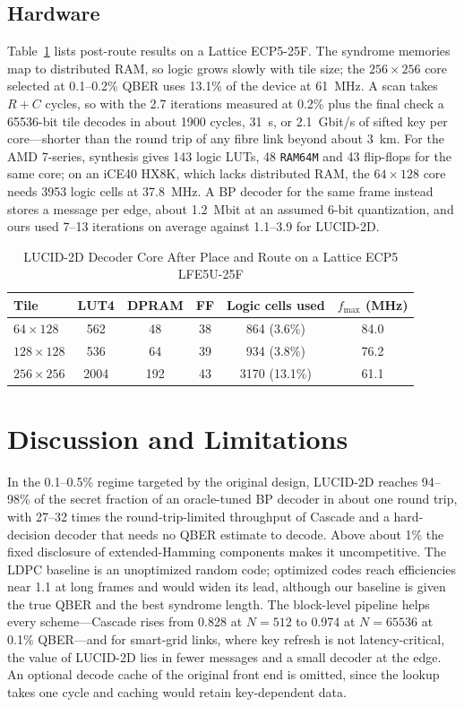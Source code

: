 \documentclass[conference]{IEEEtran}
\begin{document}
\subsection{Hardware}
Table~\ref{tab:hw} lists post-route results on a Lattice ECP5-25F. The syndrome memories map to distributed RAM, so logic grows slowly with tile size; the $256\times256$ core selected at 0.1--0.2\% QBER uses 13.1\% of the device at 61~MHz. A scan takes $R+C$ cycles, so with the 2.7 iterations measured at 0.2\% plus the final check a 65536-bit tile decodes in about 1900 cycles, 31~\textmu s, or 2.1~Gbit/s of sifted key per core---shorter than the round trip of any fibre link beyond about 3~km. For the AMD 7-series, synthesis gives 143 logic LUTs, 48 \texttt{RAM64M} and 43 flip-flops for the same core; on an iCE40 HX8K, which lacks distributed RAM, the $64\times128$ core needs 3953 logic cells at 37.8~MHz. A BP decoder for the same frame instead stores a message per edge, about 1.2~Mbit at an assumed 6-bit quantization, and ours used 7--13 iterations on average against 1.1--3.9 for LUCID-2D.

\begin{table}[t]
\caption{LUCID-2D Decoder Core After Place and Route on a Lattice ECP5 LFE5U-25F}
\label{tab:hw}
\centering
\setlength{\tabcolsep}{3.5pt}
\begin{tabular}{@{}lccccc@{}}
\toprule
Tile & LUT4 & DPRAM & FF & Logic cells used & $f_{\max}$ (MHz)\\
\midrule
$64\times128$ & 562 & 48 & 38 & 864 (3.6\%) & 84.0\\
$128\times128$ & 536 & 64 & 39 & 934 (3.8\%) & 76.2\\
$256\times256$ & 2004 & 192 & 43 & 3170 (13.1\%) & 61.1\\
\bottomrule
\end{tabular}
\end{table}

\section{Discussion and Limitations}\label{sec:discussion}
In the 0.1--0.5\% regime targeted by the original design, LUCID-2D reaches 94--98\% of the secret fraction of an oracle-tuned BP decoder in about one round trip, with 27--32 times the round-trip-limited throughput of Cascade and a hard-decision decoder that needs no QBER estimate to decode. Above about 1\% the fixed disclosure of extended-Hamming components makes it uncompetitive. The LDPC baseline is an unoptimized random code; optimized codes reach efficiencies near 1.1 at long frames and would widen its lead, although our baseline is given the true QBER and the best syndrome length. The block-level pipeline helps every scheme---Cascade rises from 0.828 at $N=512$ to 0.974 at $N=65536$ at 0.1\% QBER---and for smart-grid links, where key refresh is not latency-critical, the value of LUCID-2D lies in fewer messages and a small decoder at the edge. An optional decode cache of the original front end is omitted, since the lookup takes one cycle and caching would retain key-dependent data.
\end{document}
